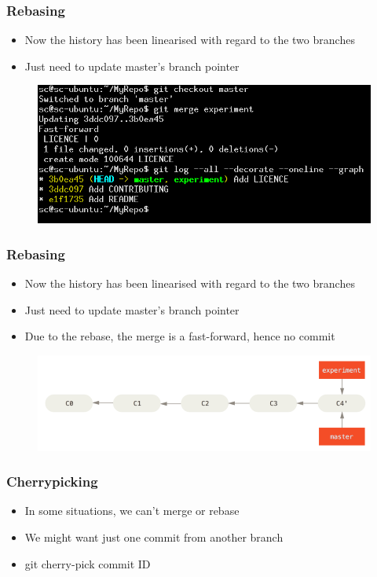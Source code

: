 \documentclass{beamer}
\begin{document}
\begin{frame}
	\frametitle{Rebasing}
	\begin{itemize}
		\item{Now the history has been linearised with regard to the two branches}
		\item{Just need to update master's branch pointer}
	\end{itemize}
	\begin{figure}
		\includegraphics[scale=0.4]{Rebasing-4.png}
	\end{figure}
\end{frame}

\begin{frame}
	\frametitle{Rebasing}
	\begin{itemize}
		\item{Now the history has been linearised with regard to the two branches}
		\item{Just need to update master's branch pointer}
		\item{Due to the rebase, the merge is a fast-forward, hence no commit}
	\end{itemize}
	\begin{figure}
		\includegraphics[scale=0.4]{Rebasing-5.png}
	\end{figure}
\end{frame}

\begin{frame}
	\frametitle{Cherrypicking}
	\begin{itemize}
		\item{In some situations, we can't merge or rebase}
		\item{We might want just one commit from another branch}
		\item{git cherry-pick \textlangle{}commit ID\textrangle{}}
	\end{itemize}
\end{frame}
\end{document}
